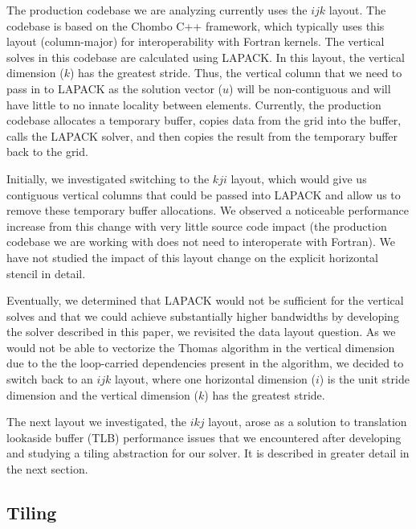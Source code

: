 \documentclass[conference]{IEEEtran}
\begin{document}
The production codebase we are analyzing currently uses the \(ijk\) layout. The
codebase is based on the Chombo C++ framework, which typically uses this layout
(column-major) for interoperability with Fortran kernels. The vertical solves
in this codebase are calculated using LAPACK. In this layout, the vertical
dimension (\(k\)) has the greatest stride. Thus, the vertical column that we
need to pass in to LAPACK as the solution vector (\(u\)) will be non-contiguous
and will have little to no innate locality between elements. Currently, the
production codebase allocates a temporary buffer, copies data from the grid
into the buffer, calls the LAPACK solver, and then copies the result from the
temporary buffer back to the grid.

Initially, we investigated switching to the \(kji\) layout, which would give us
contiguous vertical columns that could be passed into LAPACK and allow us to
remove these temporary buffer allocations. We observed a noticeable performance
increase from this change with very little source code impact (the production
codebase we are working with does not need to interoperate with Fortran). We
have not studied the impact of this layout change on the explicit horizontal
stencil in detail.

Eventually, we determined that LAPACK would not be sufficient for the vertical
solves and that we could achieve substantially higher bandwidths by developing
the solver described in this paper, we revisited the data layout question. As
we would not be able to vectorize the Thomas algorithm in the vertical
dimension due to the the loop-carried dependencies present in the algorithm, we
decided to switch back to an \(ijk\) layout, where one horizontal dimension (\(i\))
is the unit stride dimension and the vertical dimension (\(k\)) has the greatest
stride.

The next layout we investigated, the \(ikj\) layout, arose as a solution to
translation lookaside buffer (TLB) performance issues that we encountered after
developing and studying a tiling abstraction for our solver. It is described in
greater detail in the next section.

\subsection{Tiling}
\end{document}
